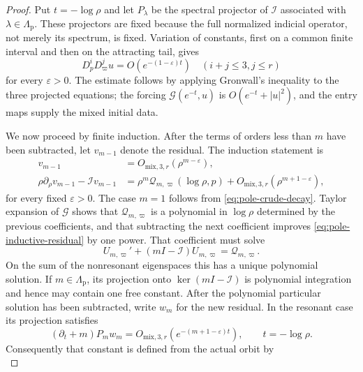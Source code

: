\documentclass[11pt]{amsart}
\numberwithin{equation}{section}
\theoremstyle{definition}
\theoremstyle{remark}
\begin{document}
\begin{proof}
Put $t=-\log\rho$ and let $P_\lambda$ be the spectral projector of
$\mathcal I$ associated with $\lambda\in\Lambda_{\mathrm p}$.  These
projectors are fixed because the full normalized indicial operator, not
merely its spectrum, is fixed.  Variation of constants,
first on a common finite interval and then on the attracting tail, gives
\begin{equation}\label{eq:pole-crude-decay}
 D_p^iD_\varpi^ju=O(e^{-(1-\varepsilon)t})
 \quad(i+j\le3, j\le r)
\end{equation}
for every $\varepsilon>0$.  The estimate follows by applying Gronwall's
inequality to the three projected equations; the forcing
$\mathcal G(e^{-t},u)$ is $O(e^{-t}+|u|^2)$, and the entry maps supply the
mixed initial data.

We now proceed by finite induction.  After the terms of orders less than
$m$ have been subtracted, let $v_{m-1}$ denote the residual.  The induction
statement is
\begin{align}
 v_{m-1}&=O_{\mathrm{mix},3,r}(\rho^{m-\varepsilon}),
 \label{eq:pole-inductive-residual}\\
 \rho\partial_\rho v_{m-1}-\mathcal I v_{m-1}
 &=\rho^m\mathcal Q_{m,\varpi}(\log\rho,p)
   +O_{\mathrm{mix},3,r}(\rho^{m+1-\varepsilon}),
 \label{eq:pole-inductive-defect}
\end{align}
for every fixed $\varepsilon>0$.  The case $m=1$ follows from
\eqref{eq:pole-crude-decay}.  Taylor expansion of $\mathcal G$ shows that
$\mathcal Q_{m,\varpi}$ is a polynomial in $\log\rho$ determined by the
previous coefficients, and that subtracting the next coefficient improves
\eqref{eq:pole-inductive-residual} by one power.  That coefficient must
solve
\begin{equation}\label{eq:pole-homological-recursion}
 U_{m,\varpi}'+(mI-\mathcal I)U_{m,\varpi}
 =\mathcal Q_{m,\varpi}.
\end{equation}
On the sum of the nonresonant eigenspaces this has a unique polynomial
solution.  If $m\in\Lambda_{\mathrm p}$, its projection onto
$\ker(mI-\mathcal I)$ is polynomial integration and hence may contain one
free constant.  After the polynomial particular solution has been
subtracted, write $w_m$ for the new residual.  In the resonant case its
projection satisfies
\[
 (\partial_t+m)P_mw_m
 =O_{\mathrm{mix},3,r}(e^{-(m+1-\varepsilon)t}),
 \qquad t=-\log\rho.
\]
Consequently that constant is defined from the actual orbit by
\begin{equation}\label{eq:pole-resonant-mode-coefficient}

\end{equation}
\end{proof}
\end{document}
